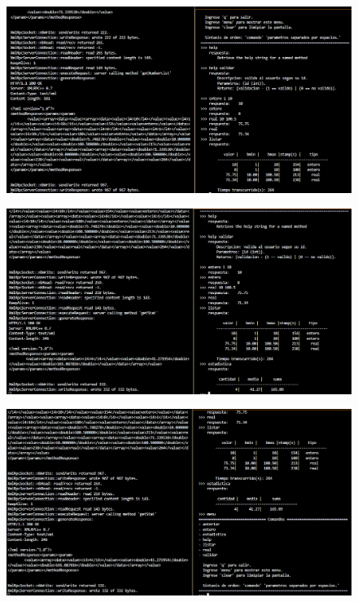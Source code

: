 \documentclass[a4paper,12pt]{article}
\begin{document}
\begin{figure}[htbp]
    \begin{adjustbox}{max width=\textwidth, center}
        \includegraphics{C5/Servidor_cliente_9.PNG}
    \end{adjustbox}
\end{figure}
\begin{figure}[htbp]
    \begin{adjustbox}{max width=\textwidth, center}
        \includegraphics{C5/Servidor_cliente_10.PNG}
    \end{adjustbox}
\end{figure}
\begin{figure}[htbp]
    \begin{adjustbox}{max width=\textwidth, center}
        \includegraphics{C5/Servidor_cliente_11.PNG}
    \end{adjustbox}
\end{figure}
\end{document}
